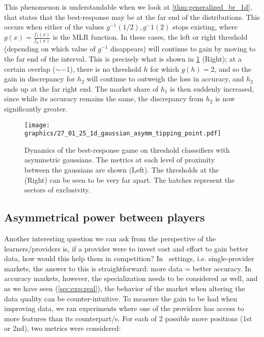This phenomenon is understandable when we look at \cref{thm:generalized_br_1d}, that states that the best-response may be at the far end of the distributions. This occurs when either of the values $g^{-1}(1/2), g^-1(2)$ stops existing, where $g(x) = \frac{f_1(x)}{f_0(x)}$ is the MLR function. In these cases, the left or right threshold (depending on which value of $g^{-1}$ disappears) will continue to gain by moving to the far end of the interval. 
This is precisely what is shown in \cref{fig:gauss_asymm_tipping_pt} (Right); at a certain overlap ($\sim-1$), there is no threshold $h$ for which $g(h)=2$, and so the gain in discrepancy for $h_2$ will continue to outweigh the loss in accuracy, and $h_2$ ends up at the far right end. 
The market share of $h_1$ is then suddenly increased, since while its accuracy remains the same, the discrepancy from $h_2$ is now significantly greater. 
\begin{figure}[t!]
    \centering
    \texttt{[image: graphics/27\_01\_25\_1d\_gaussian\_asymm\_tipping\_point.pdf]}
    \caption{Dynamics of the best-response game on threshold classsifiers with asymmetric gaussians. The metrics at each level of proximity between the gaussians are shown (Left). The thresholds at the  (Right) can be seen to be very far apart. The hatches represent the sectors of exclusivity. }
    \label{fig:gauss_asymm_tipping_pt}
\end{figure}
\subsection{Asymmetrical power between players}
Another interesting question we can ask from the perspective of the learners/providers is, if a provider were to invest cost and effort to gain better data, how would this help them in competition? In \naive 
\ settings, i.e. single-provider markets, the answer to this is straightforward: more data = better accuracy. In accuracy markets, however, the specialization needs to be considered as well, and as we have seen (\cref{sec:exp:real}), the behavior of the market when altering the data quality can be counter-intuitive.
To measure the gain to be had when improving data, we ran experiments where one of the providers has access to more features than its counterpart/s.
For each of 2 possible move positions (1st or 2nd), two metrics were considered:

